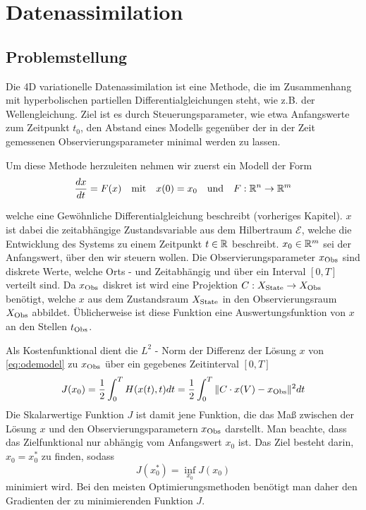 \chapter{Datenassimilation}



\section{Problemstellung}
Die 4D variationelle Datenassimilation ist eine Methode, die im Zusammenhang mit hyperbolischen partiellen Differentialgleichungen steht, wie z.B. der Wellengleichung. Ziel ist es durch Steuerungsparameter, wie etwa Anfangswerte zum Zeitpunkt $t_0$, den Abstand eines Modells gegenüber der in der Zeit gemessenen Observierungsparameter minimal werden zu lassen. 


Um diese Methode herzuleiten nehmen wir zuerst ein Modell der Form
\begin{equation}
\label{eq:odemodel}
 \frac{dx}{dt} = F(x)\quad \text{mit} \quad x(0) = x_0 \quad \text{und}\quad F:\mathbb{R}^n\to \mathbb{R}^m
\end{equation}
  
welche eine Gewöhnliche Differentialgleichung beschreibt (vorheriges Kapitel). $x$ ist dabei die zeitabhängige Zustandsvariable aus dem Hilbertraum $\mathcal{E}$, welche die Entwicklung des Systems zu einem Zeitpunkt $t\in \mathbb{R}$ beschreibt. 
$x_0 \in \mathbb{R}^m$ sei der Anfangswert, über den wir steuern wollen.
Die Observierungsparameter $x_{\text{Obs}}$ sind diskrete Werte, welche Orts - und Zeitabhängig und über ein Interval $[0,T]$ verteilt sind. Da $x_{\text{Obs}}$ diskret ist wird eine Projektion $C:X_{\text{State}}\to X_{\text{Obs}}$ benötigt, welche $x$ aus dem Zustandsraum $X_{\text{State}}$ in den Observierungsraum $X_{\text{Obs}}$ abbildet. Üblicherweise ist diese Funktion eine Auswertungsfunktion von $x$ an den Stellen $t_{\text{Obs}}$.

Als Kostenfunktional dient die $L^2$ - Norm der Differenz der Lösung $x$ von \eqref{eq:odemodel} zu $x_{\text{Obs}}$ über ein gegebenes Zeitinterval $[0,T]$
\begin{equation}
 J(x_0) = \frac{1}{2}\int_0^T H(x(t),t)dt= \frac{1}{2}\int_0^T \|C\cdot x(V)-x_{\text{Obs}}\|^2dt
\end{equation}
Die Skalarwertige Funktion $J$ ist damit jene Funktion, die das Maß zwischen der Lösung $x$ und den Observierungsparametern $x_{\text{Obs}}$ darstellt.
Man beachte, dass das Zielfunktional nur abhängig vom Anfangswert $x_0$ ist. Das Ziel besteht darin, $x_0 = x_0^*$ zu finden, sodass
\[
 J(x_0^*) = \inf_{x_0} J(x_0) 
\]
minimiert wird. Bei den meisten Optimierungsmethoden benötigt man daher den Gradienten der zu minimierenden Funktion $J$.

